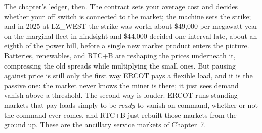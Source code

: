 \bigskip

The chapter's ledger, then. The contract sets your average cost and decides whether your off switch is connected to the market; the machine sets the strike; and in 2025 at LZ\_WEST the strike was worth about \$49,000 per megawatt-year on the marginal fleet in hindsight and \$44,000 decided one interval late, about an eighth of the power bill, before a single new market product enters the picture. %
Batteries, renewables, and RTC+B are reshaping the prices underneath it, compressing the old spreads while multiplying the small ones. But pausing against price is still only the first way ERCOT pays a flexible load, and it is the passive one: the market never knows the miner is there; it just sees demand vanish above a threshold. The second way is louder. ERCOT runs standing markets that pay loads simply to be \emph{ready} to vanish on command, whether or not the command ever comes, and RTC+B just rebuilt those markets from the ground up. These are the ancillary service markets of Chapter~7.
